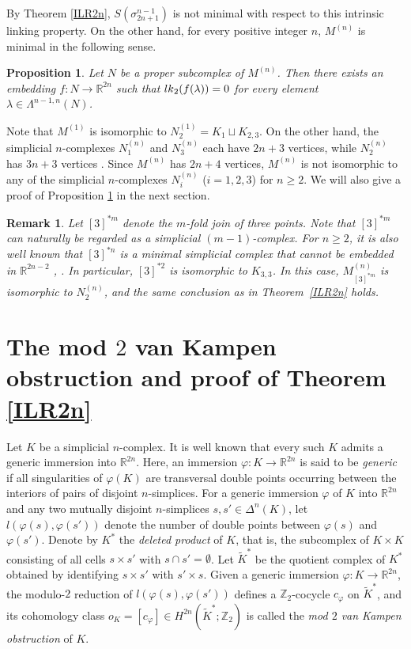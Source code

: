 \documentclass[10pt,a4paper]{amsart}
\newtheorem{Proposition}[Theorem]{Proposition}
\newtheorem{Remark}[Theorem]{Remark}
\numberwithin{equation}{section}
\begin{document}
By Theorem \ref{ILR2n}, $S(\sigma_{2n+1}^{n-1})$ is not minimal with respect to this intrinsic linking property. On the other hand, for every positive integer $n$, $M^{(n)}$ is minimal in the following sense.

\begin{Proposition}\label{ILRn2min}
Let $N$ be a proper subcomplex of $M^{(n)}$. Then there exists an embedding $f \colon N \to \mathbb{R}^{2n}$ such that ${\rm lk}_2(f(\lambda)) = 0$ for every element $\lambda \in \Lambda^{n-1,n}(N)$.
\end{Proposition}

Note that $M^{(1)}$ is isomorphic to $N_{2}^{(1)} = K_1 \sqcup K_{2,3}$. On the other hand, the simplicial $n$-complexes $N_{1}^{(n)}$ and $N_3^{(n)}$ each have $2n+3$ vertices, while $N_2^{(n)}$ has $3n+3$ vertices \cite{N26b}. Since $M^{(n)}$ has $2n+4$ vertices, $M^{(n)}$ is not isomorphic to any of the simplicial $n$-complexes $N_{i}^{(n)}$ ($i=1,2,3$) for $n \ge 2$. We will also give a proof of Proposition \ref{ILRn2min} in the next section.


\begin{Remark}\label{k33}
Let $[3]^{*m}$ denote the $m$-fold join of three points. Note that $[3]^{*m}$ can naturally be regarded as a simplicial $(m-1)$-complex. For $n \ge 2$, it is also well known that $[3]^{*n}$ is a minimal simplicial complex that cannot be embedded in $\mathbb{R}^{2n-2}$ \cite{VK33}, \cite{Flores32}. In particular, $[3]^{*2}$ is isomorphic to $K_{3,3}$. In this case, $M_{[3]^{*m}}^{(n)}$ is isomorphic to $N_2^{(n)}$, and the same conclusion as in Theorem~\ref{ILR2n} holds. 
\end{Remark}




\section{The mod $2$ van Kampen obstruction and proof of Theorem \ref{ILR2n}}

Let $K$ be a simplicial $n$-complex. It is well known that every such $K$ admits a generic immersion into $\mathbb{R}^{2n}$. Here, an immersion $\varphi \colon K \to \mathbb{R}^{2n}$ is said to be \textit{generic} if all singularities of $\varphi(K)$ are transversal double points occurring between the interiors of pairs of disjoint $n$-simplices. For a generic immersion $\varphi$ of $K$ into $\mathbb{R}^{2n}$ and any two mutually disjoint $n$-simplices $s, s' \in \varDelta^n(K)$, let $l(\varphi(s),\varphi(s'))$ denote the number of double points between $\varphi(s)$ and $\varphi(s')$. Denote by $K^*$ the \emph{deleted product} of $K$, that is, the subcomplex of $K \times K$ consisting of all cells $s \times s'$ with $s \cap s' = \emptyset$. Let $\widetilde{K}^*$ be the quotient complex of $K^*$ obtained by identifying $s \times s'$ with $s' \times s$. Given a generic immersion $\varphi \colon K \to \mathbb{R}^{2n}$, the modulo-$2$ reduction of $l(\varphi(s),\varphi(s'))$ defines a $\mathbb{Z}_2$-cocycle $c_{\varphi}$ on $\widetilde{K}^*$, and its cohomology class $o_K = [c_{\varphi}] \in H^{2n}(\widetilde{K}^*;\mathbb{Z}_2)$ is called the \emph{mod $2$ van Kampen obstruction} of $K$.
\end{document}

